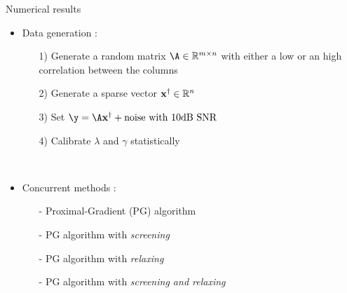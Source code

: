 \documentclass[final]{beamer}
\newcommand{\emphone}[1]{\textit{\color{norange}#1}}
\newlength{\sepwid}
\newlength{\onecolwid}
\begin{document}
\begin{frame}[t]
\begin{columns}[t]
\begin{column}{\sepwid}\end{column}

\begin{column}{\onecolwid}

\begin{block}{Numerical results}

    \begin{itemize}
        \item \hspace{0.1in} Data generation :
        \begin{itemize}
            \normalsize \item[1)] \hspace{0.1in} \normalsize Generate a random matrix $\dic \in \kR^{\ddim\times\pdim}$ with either a low or an high correlation between the columns
            \item[2)] \hspace{0.1in} \normalsize Generate a sparse vector $\pv^{\dagger} \in \kR^{\pdim}$
            \item[3)] \hspace{0.1in} \normalsize Set $\obs = \dic\pv^{\dagger} + \text{noise with 10dB SNR}$
            \item[4)] \hspace{0.1in} \normalsize Calibrate $\lambda$ and $\gamma$ statistically
        \end{itemize}
    \end{itemize}
    ~\\
    \begin{itemize}
        \item \hspace{0.1in} Concurrent methods :
        \begin{itemize}
            \normalsize \item[-] \hspace{0.1in} \normalsize Proximal-Gradient (PG) algorithm
            \item[-] \hspace{0.1in} \normalsize PG algorithm with \emphone{screening}
            \item[-] \hspace{0.1in} \normalsize PG algorithm with \emphone{relaxing}
            \item[-] \hspace{0.1in} \normalsize PG algorithm with \emphone{screening and relaxing}
        \end{itemize}

\end{itemize}
\end{block}
\end{column}
\end{columns}
\end{frame}
\end{document}
